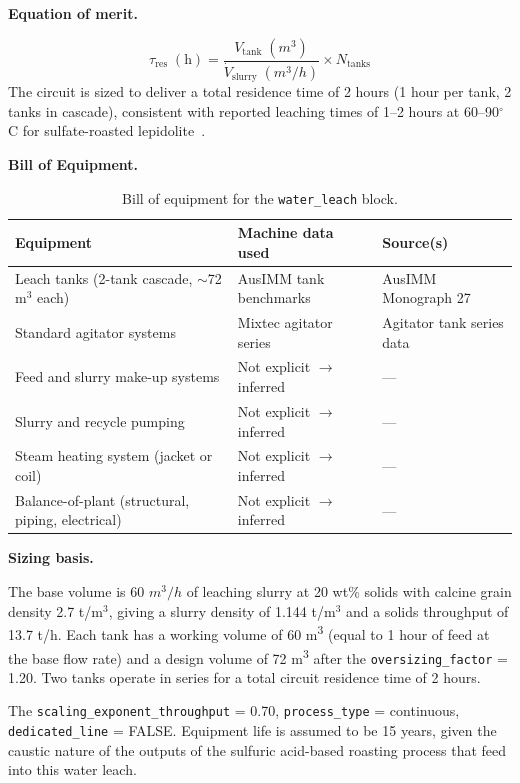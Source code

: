 \medskip
\noindent\textbf{Equation of merit.}\quad

\[
	\tau_\text{res}\;(\text{h}) = \frac{V_\text{tank}\;(\si{m^3})}{\dot{V}_\text{slurry}\;(\si{m^3/h})} \times N_\text{tanks}
\]
The circuit is sized to deliver a total residence time of 2 hours (1 hour per tank, 2 tanks in cascade), consistent with reported leaching times of 1--2 hours at 60--90$^\circ$C for sulfate-roasted lepidolite~\citep{yanExtractionLithiumLepidolite2012, dengSystematicReviewSulfate2026}.

\medskip
\noindent\textbf{Bill of Equipment.}\quad

\begin{table}[h!]
\caption{Bill of equipment for the \texttt{water\_leach} block.}
\centering
\begin{tabular}{>{\raggedright\arraybackslash}p{5.2cm}
				>{\raggedright\arraybackslash}p{4cm}
				>{\raggedright\arraybackslash}p{4.5cm}}
\toprule
\textbf{Equipment} & \textbf{Machine data used} & \textbf{Source(s)} \\
\midrule
Leach tanks (2-tank cascade, $\sim$72 m$^3$ each) & AusIMM tank benchmarks & AusIMM Monograph 27 \\
Standard agitator systems & Mixtec agitator series & Agitator tank series data \\
Feed and slurry make-up systems & Not explicit $\rightarrow$ inferred & --- \\
Slurry and recycle pumping & Not explicit $\rightarrow$ inferred & --- \\
Steam heating system (jacket or coil) & Not explicit $\rightarrow$ inferred & --- \\
Balance-of-plant (structural, piping, electrical) & Not explicit $\rightarrow$ inferred & --- \\
\bottomrule
\end{tabular}
\end{table}

\medskip
\noindent\textbf{Sizing basis.}\quad

The base volume is 60 $\si{m^3/h}$ of leaching slurry at 20 wt\% solids with calcine grain density 2.7 t/m$^3$, giving a slurry density of 1.144 t/m$^3$ and a solids throughput of 13.7 t/h. Each tank has a working volume of 60 \si{m^3} (equal to 1 hour of feed at the base flow rate) and a design volume of 72 \si{m^3} after the \texttt{oversizing\_factor} = 1.20. Two tanks operate in series for a total circuit residence time of 2 hours.

The \texttt{scaling\_exponent\_throughput} = 0.70, \texttt{process\_type} = continuous, \texttt{dedicated\_line} = FALSE. Equipment life is assumed to be 15 years, given the caustic nature of the outputs of the sulfuric acid-based roasting process that feed into this water leach. 

